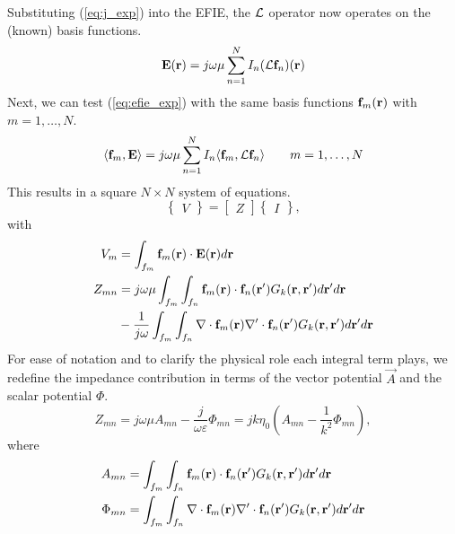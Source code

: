 Substituting (\ref{eq:j_exp}) into the EFIE, the $\mathcal{L}$ operator now operates on the (known) basis functions.
\begin{equation}
	\mathbf{E}(\mathbf{r}) = j\omega\mu \sum_{n = 1}^{N} I_n (\mathcal{L} \mathbf{f}_n)(\mathbf{r})
	\label{eq:efie_exp}
\end{equation}
Next, we can test (\ref{eq:efie_exp}) with the same basis functions $\mathbf{f}_m(\mathbf{r})$ with $m = 1, \dots, N$.
\begin{equation}
	\langle \mathbf{f}_m, \mathbf{E} \rangle = j\omega\mu \sum_{n = 1}^{N} I_n \langle \mathbf{f}_m, \mathcal{L} \mathbf{f}_n \rangle \qquad m = 1, \dots, N
\end{equation}
This results in a square $N \times N$ system of equations.
\begin{equation}
	\begin{Bmatrix}
		V
	\end{Bmatrix} = \begin{bmatrix}
		Z
	\end{bmatrix} \begin{Bmatrix}
		I
	\end{Bmatrix},
\end{equation}
with
\begin{align*}
	V_m & = \int_{f_m} \mathbf{f}_m(\mathbf{r}) \cdot \mathbf{E}(\mathbf{r}) d\mathbf{r} \\
	Z_{mn} & = j\omega\mu \int_{f_m} \int_{f_n} \mathbf{f}_m(\mathbf{r}) \cdot \mathbf{f}_n(\mathbf{r}^\prime) G_k(\mathbf{r}, \mathbf{r}^\prime) d\mathbf{r}^\prime d\mathbf{r} \\
	 & - \frac{1}{j\omega} \int_{f_m} \int_{f_n} \nabla \cdot \mathbf{f}_m(\mathbf{r}) \nabla^\prime \cdot \mathbf{f}_n(\mathbf{r}^\prime) G_k(\mathbf{r}, \mathbf{r}^\prime) d\mathbf{r}^\prime d\mathbf{r}
\end{align*}
For ease of notation and to clarify the physical role each integral term plays, we redefine the impedance contribution in terms of the vector potential $\vec{A}$ and the scalar potential $\Phi$.
\begin{equation}
	Z_{mn} = j\omega\mu A_{mn} - \frac{j}{\omega\varepsilon} \Phi_{mn} = j k \eta_0 \left(A_{mn} - \frac{1}{k^2} \Phi_{mn} \right),
\end{equation}
where
\begin{align}
	A_{mn} & = \int_{f_m} \int_{f_n} \mathbf{f}_m(\mathbf{r}) \cdot \mathbf{f}_n(\mathbf{r}^\prime) G_k(\mathbf{r}, \mathbf{r}^\prime) d\mathbf{r}^\prime d\mathbf{r} \label{eq:Amn} \\
	\Phi_{mn} & = \int_{f_m} \int_{f_n} \nabla \cdot \mathbf{f}_m(\mathbf{r}) \nabla^\prime \cdot \mathbf{f}_n(\mathbf{r}^\prime) G_k(\mathbf{r}, \mathbf{r}^\prime) d\mathbf{r}^\prime d\mathbf{r} \label{eq:Pmn}
\end{align}

